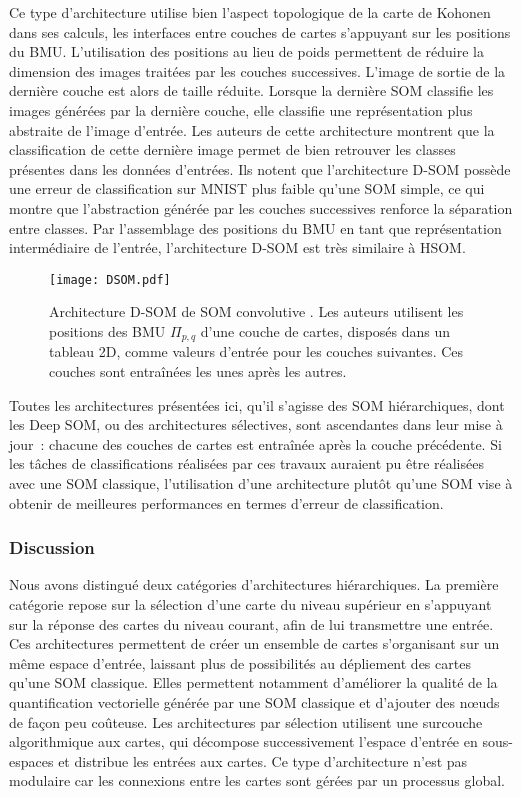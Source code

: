 \documentclass[../main]{subfiles}
\begin{document}
Ce type d'architecture utilise bien l'aspect topologique de la carte de Kohonen dans ses calculs, les interfaces entre couches de cartes s'appuyant sur les positions du BMU. L'utilisation des positions au lieu de poids permettent de réduire la dimension des images traitées par les couches successives. L'image de sortie de la dernière couche est alors de taille réduite. Lorsque la dernière SOM classifie les images générées par la dernière couche, elle classifie une représentation plus abstraite de l'image d'entrée. 
Les auteurs de cette architecture montrent que la classification de cette dernière image permet de bien retrouver les classes présentes dans les données d'entrées. Ils notent que l'architecture D-SOM possède une erreur de classification sur MNIST plus faible qu'une SOM simple, ce qui montre que l'abstraction générée par les couches successives renforce la séparation entre classes.
Par l'assemblage des positions du BMU en tant que représentation intermédiaire de l'entrée, l'architecture D-SOM est très similaire à HSOM.

\begin{figure}[t]
    \texttt{[image: DSOM.pdf]}
    \caption{Architecture D-SOM de SOM \og convolutive \fg{} \parencite{liu_deep_2015}. Les auteurs utilisent les positions des BMU $\Pi_{p,q}$ d'une couche de cartes, disposés dans un tableau 2D, comme valeurs d'entrée pour les couches suivantes. Ces couches sont entraînées les unes après les autres. \label{fig:dsom}}
\end{figure}

Toutes les architectures présentées ici, qu'il s'agisse des SOM hiérarchiques, dont les Deep SOM, ou des architectures sélectives, sont ascendantes dans leur mise à jour~: chacune des couches de cartes est entraînée après la couche précédente.
Si les tâches de classifications réalisées par ces travaux auraient pu être réalisées avec une SOM classique, l'utilisation d'une architecture plutôt qu'une SOM vise à obtenir de meilleures performances en termes d'erreur de classification.

\subsubsection{Discussion}

Nous avons distingué deux catégories d'architectures hiérarchiques. La première catégorie repose sur la sélection d'une carte du niveau supérieur en s'appuyant sur la réponse des cartes du niveau courant, afin de lui transmettre une entrée.
Ces architectures permettent de créer un ensemble de cartes s'organisant sur un même espace d'entrée, laissant plus de possibilités au dépliement des cartes qu'une SOM classique. 
Elles permettent notamment d'améliorer la qualité de la quantification vectorielle générée par une SOM classique et d'ajouter des n\oe{}uds de façon peu coûteuse. Les architectures par sélection utilisent une surcouche algorithmique aux cartes, qui décompose successivement l'espace d'entrée en sous-espaces et distribue les entrées aux cartes. Ce type d'architecture n'est pas modulaire car les connexions entre les cartes sont gérées par un processus global.
\end{document}
